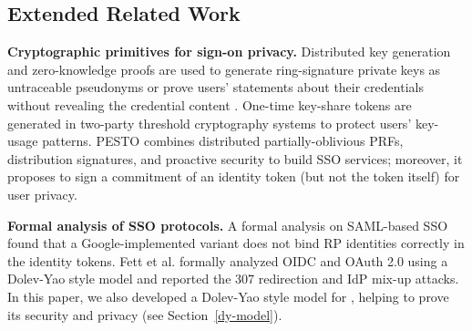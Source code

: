 \subsection{Extended Related Work}
\noindent\textbf{Cryptographic primitives for sign-on privacy.}
Distributed key generation and zero-knowledge proofs are used to generate ring-signature private keys as untraceable pseudonyms \cite{crypto-book} or prove users' statements about their credentials without revealing the credential content \cite{zklaim}.
One-time key-share tokens \cite{tandem} are generated in two-party threshold cryptography systems to protect users' key-usage patterns.
\newc
PESTO \cite{pesto} combines distributed partially-oblivious PRFs, distribution signatures,
    and proactive security to build SSO services;
    moreover, it proposes to sign a commitment of an identity token (but not the token itself) for user privacy.



 \oldc\noindent\textbf{Formal analysis of SSO protocols.}
A formal analysis on SAML-based SSO \cite{ArmandoCCCT08} found that a Google-implemented variant does not bind RP identities correctly in the identity tokens.
Fett et al. \cite{FettKS16, FettKS17} formally analyzed OIDC and OAuth 2.0 using a Dolev-Yao style model \cite{FettKS14} and reported the 307 redirection and IdP mix-up attacks.
In this paper, we also developed a Dolev-Yao style model for \usso, helping to prove its security and privacy (see Section~\ref{dy-model}).


